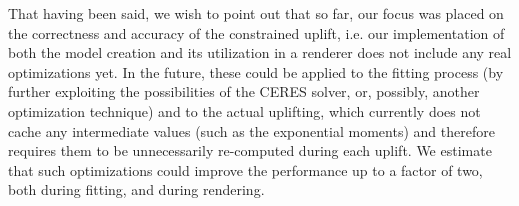 That having been said, we wish to point out that so far, our focus was placed on the correctness and accuracy of the constrained uplift, i.e. our implementation of both the model creation and its utilization in a renderer does not include any real optimizations yet. In the future, these could be applied to the fitting process (by further exploiting the possibilities of the CERES solver, or, possibly, another optimization technique) and to the actual uplifting, which currently does not cache any intermediate values (such as the exponential moments) and therefore requires them to be unnecessarily re-computed during each uplift. We estimate that such optimizations could improve the performance up to a factor of two, both during fitting, and during rendering.